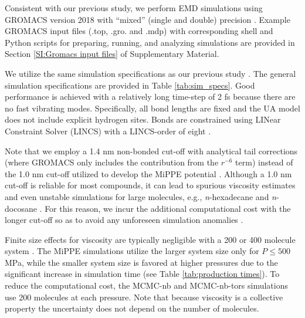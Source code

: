 \documentclass[preprint,review,12pt]{elsarticle}
\begin{document}
Consistent with our previous study, we perform EMD simulations using GROMACS version 2018 with ``mixed'' (single and double) precision \cite{GROMACS_2018}. Example GROMACS input files (.top, .gro. and .mdp) with corresponding shell and Python scripts for preparing, running, and analyzing simulations are provided in Section \ref{SI:Gromacs input files} of Supplementary Material.
	
	
	
    We utilize the same simulation specifications as our previous study \cite{Postdoc_3}. The general simulation specifications are provided in Table \ref{tab:sim_specs}. Good performance is achieved with a relatively long time-step of 2 fs because there are no fast vibrating modes. Specifically, all bond lengths are fixed and the UA model does not include explicit hydrogen sites. Bonds are constrained using LINear Constraint Solver (LINCS) with a LINCS-order of eight \cite{Hess1998,Hess2008}. 
       
    Note that we employ a 1.4 nm non-bonded cut-off with analytical tail corrections (where GROMACS only includes the contribution from the $r^{-6}$ term) instead of the 1.0 nm cut-off utilized to develop the MiPPE potential \cite{Mie,Potoff_branched}. Although a 1.0 nm cut-off is reliable for most compounds, it can lead to spurious viscosity estimates and even unstable simulations for large molecules, e.g., \textit{n}-hexadecane and \textit{n}-docosane \cite{Postdoc_3}. For this reason, we incur the additional computational cost with the longer cut-off so as to avoid any unforeseen simulation anomalies \cite{Leonard2018}. 
	
	Finite size effects for viscosity are typically negligible with a 200 or 400 molecule system \cite{Postdoc_3,Kim2018}. The MiPPE simulations utilize the larger system size only for $P \le 500$ MPa, while the smaller system size is favored at higher pressures due to the significant increase in simulation time (see Table \ref{tab:production times}). To reduce the computational cost, the MCMC-nb and MCMC-nb-tors simulations use 200 molecules at each pressure. Note that because viscosity is a collective property the uncertainty does not depend on the number of molecules.
	 
\end{document}

